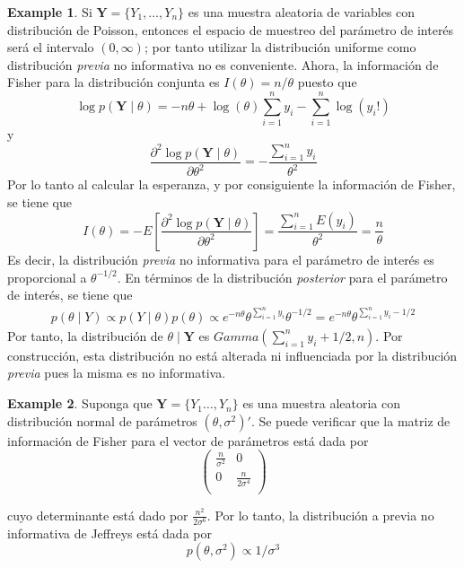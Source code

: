 \documentclass[
  spanish,
  letter]{book}
\theoremstyle{definition}
\theoremstyle{definition}
\newtheorem{example}{Example}[chapter]
\theoremstyle{definition}
\theoremstyle{remark}
\begin{document}
\begin{example}
\protect\hypertarget{exm:unnamed-chunk-36}{}{\label{exm:unnamed-chunk-36} }\label{EjemPoisson}
Si \(\mathbf{Y}=\{Y_1,\ldots,Y_n\}\) es una muestra aleatoria de variables con distribución de Poisson, entonces el espacio de muestreo del parámetro de interés será el intervalo \((0,\infty)\); por tanto utilizar la distribución uniforme como distribución \emph{previa} no informativa no es conveniente. Ahora, la información de Fisher para la distribución conjunta es \(I(\theta)=n/\theta\) puesto que
\begin{equation*}
\log p(\mathbf{Y} \mid \theta)=-n\theta+\log(\theta)\sum_{i=1}^ny_i-\sum_{i=1}^n\log(y_i!)
\end{equation*}
y
\begin{equation*}
\frac{\partial^2 \log p(\mathbf{Y} \mid \theta)}{\partial\theta^2}=-\frac{\sum_{i=1}^ny_i}{\theta^2}
\end{equation*}
Por lo tanto al calcular la esperanza, y por consiguiente la información de Fisher, se tiene que
\begin{equation*}
I(\theta)=- E\left[\frac{\partial^2 \log p(\mathbf{Y} \mid \theta)}{\partial\theta^2}\right]
=\frac{\sum_{i=1}^nE(y_i)}{\theta^2}=\frac{n}{\theta}
\end{equation*}
Es decir, la distribución \emph{previa} no informativa para el parámetro de interés es proporcional a \(\theta^{-1/2}\). En términos de la distribución \emph{posterior} para el parámetro de interés, se tiene que
\begin{align*}
p(\theta \mid Y) \propto p(Y \mid \theta) p(\theta) \propto e^{-n\theta} \theta^{\sum_{i=1}^ny_i}\theta^{-1/2}
=e^{-n\theta} \theta^{\sum_{i=1}^ny_i-1/2}
\end{align*}
Por tanto, la distribución de \(\theta \mid \mathbf{Y}\) es \(Gamma(\sum_{i=1}^ny_i+1/2,n)\). Por construcción, esta distribución no está alterada ni influenciada por la distribución \emph{previa} pues la misma es no informativa.
\end{example}

\begin{example}
\protect\hypertarget{exm:unnamed-chunk-37}{}{\label{exm:unnamed-chunk-37} }Suponga que \(\mathbf{Y}=\{Y_1\ldots, Y_n\}\) es una muestra aleatoria con distribución normal de parámetros \((\theta, \sigma^2)'\). Se puede verificar que la matriz de información de Fisher para el vector de parámetros está dada por
\begin{equation}
\begin{pmatrix}
  \frac{n}{\sigma^2} & 0 \\
  0 & \frac{n}{2\sigma^4} \\
\end{pmatrix}
\end{equation}

cuyo determinante está dado por \(\frac{n^2}{2\sigma^6}\). Por lo tanto, la distribución a previa no informativa de Jeffreys está dada por
\begin{equation}
p(\theta,\sigma^2)\propto 1/\sigma^3
\end{equation}
\end{example}
\end{document}
